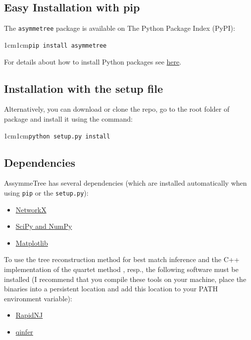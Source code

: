 \documentclass[hidelinks,11pt]{scrreprt}
\newcommand{\COMMANDLINE}[1]{\begingroup\par\vspace{3mm}\color{darkgrey}\begin{adjustwidth}{1cm}{1cm}\texttt{#1}\end{adjustwidth}\vspace{3mm}\endgroup}
\begin{document}
\subsection{Easy Installation with pip}


The \texttt{asymmetree} package is available on The Python Package Index (PyPI):

\COMMANDLINE{pip install asymmetree}

\noindent
For details about how to install Python packages see
\href{https://packaging.python.org/tutorials/installing-packages/}{here}.

\subsection{Installation with the setup file}


Alternatively, you can download or clone the repo, go to the root folder of package and install it using the command:

\COMMANDLINE{python setup.py install}


\subsection{Dependencies}

AssymmeTree has several dependencies (which are installed automatically when using \texttt{pip} or the \texttt{setup.py}):

\begin{itemize}
	\item \href{https://networkx.github.io}{NetworkX}
	\item \href{http://www.scipy.org/install.html}{SciPy and NumPy}
	\item \href{https://matplotlib.org/}{Matplotlib}
\end{itemize}

To use the tree reconstruction method for best match inference and the C++ implementation of the quartet method \citep{stadler2020}, resp., the following software must be installed
(I recommend that you compile these tools on your machine, place the binaries into a persistent location and add this location to your PATH environment variable):

\begin{itemize}
	\item \href{https://birc.au.dk/software/rapidnj/}{RapidNJ} \citep{simonsen2008}
	\item \href{https://github.com/david-schaller/qinfer}{qinfer}
\end{itemize}
\end{document}
